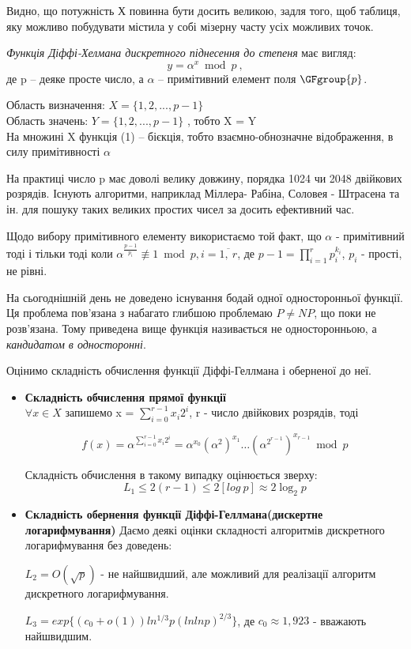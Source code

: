 Видно, що потужність $Х$ повинна бути досить великою, задля того, щоб таблиця, яку можливо побудувати містила у собі мізерну часту усіх можливих точок.

\begin{mydef}
\textit{Функція Діффі-Хелмана дискретного піднесення до степеня} має вигляд:
\[ y = \alpha^x \bmod p \:,\]
де p -- деяке просте число, а $\alpha$ -- примітивний елемент поля $\GFgroup{p}$.
\end{mydef}
Область визначення: $X = \{1,2,...,p-1\}$ \\
Область значень: $Y = \{1,2,...,p-1\}$ , тобто X = Y \\
На множині X функція (1) -- бієкція, тобто взаємно-обнозначне відображення, в силу примітивності $\alpha$

На практиці число p має доволі велику довжину, порядка 1024 чи 2048 двійкових розрядів. Існують алгоритми, наприклад Міллера- Рабіна, Соловея - Штрасена та ін. для пошуку таких великих простих чисел за досить ефективний час.

Щодо вибору примітивного елементу використаємо той факт, що $\alpha$ - примітивний тоді і тільки тоді коли $\alpha^\frac{p-1}{p_{i}}\not\equiv 1 \bmod p, i = \overline{1,\ r}$, 
де $p-1 = \prod\limits_{i=1}^r p_i^{k_i}$, $p_{i}$ - прості, не рівні.

\begin{remark}
На сьогоднішній день не доведено існування бодай одної односторонньої функції. Ця проблема пов'язана з набагато глибшою проблемаю $P \neq NP$, що поки не розв'язана. Тому приведена вище функція називається не односторонньою, а \textit{кандидатом в односторонні}.
\end{remark}
Оцінимо складність обчислення функції Діффі-Геллмана і оберненої до неї.
\begin{itemize}

\item \textbf{Складність обчислення прямої функції}\\
$\forall x \in X $ запишемо x = $\sum_{i=0}^{r-1} x_i2^i $, r - число двійкових розрядів, тоді

\[f(x) = \alpha^{\sum_{i=0}^{r-1} x_i2^i} = \alpha^{x_0}(\alpha^{2})^{x_1}\dots(\alpha^{2^{r-1}})^{x_{r-1}} \bmod p\]

Складність обчислення в такому випадку оцінюється зверху: 
\[L_1 \leq 2(r-1) \leq 2[log\: p] \approx 2\log_2 p\]

\item \textbf{Складність обернення функції Діффі-Геллмана(дискертне логарифмування)}
Даємо деякі оцінки складності алгоритмів дискретного логарифмування без доведень:

$L_2 = O( \sqrt{p})$ - не найшвидший, але можливий для реалізації алгоритм дискретного логарифмування.

$L_3 = exp\{(c_0 + o(1)) ln^{1/3}p(lnlnp)^{2/3}\}$, де $c_0 \approx 1,923$ - вважають найшвидшим.

\end{itemize}

